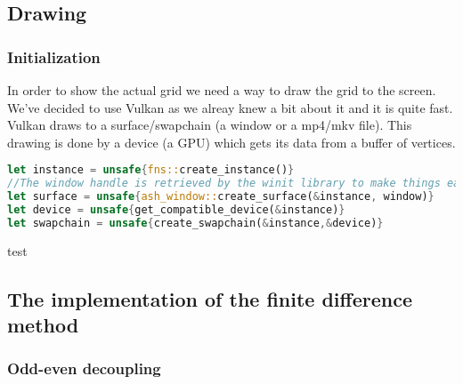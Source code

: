 \documentclass{article}
\begin{document}
\subsection{Drawing}
\subsubsection{Initialization}
In order to show the actual grid we need a way to draw the grid to the screen. We've decided to use Vulkan as we alreay knew a bit about it and it is quite fast.\cite{Vulkan} Vulkan draws to a surface/swapchain (a window or a mp4/mkv file). This drawing is done by a device (a GPU) which gets its data from a buffer of vertices.
\begin{lstlisting}[language=Rust, style=boxed]
let instance = unsafe{fns::create_instance()}
//The window handle is retrieved by the winit library to make things easier
let surface = unsafe{ash_window::create_surface(&instance, window)}
let device = unsafe{get_compatible_device(&instance)}
let swapchain = unsafe{create_swapchain(&instance,&device)}
\end{lstlisting}
test
\subsection{The implementation of the finite difference method}
\subsubsection{Odd-even decoupling}

\begin{figure}
 \caption{} \label{Odd-even decoupling} \end{figure}
\end{document}
